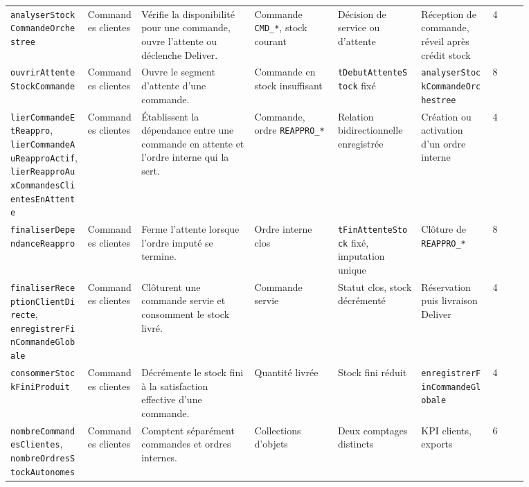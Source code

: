 \begin{landscape}
{\begin{longtable}{L{0.13\linewidth} L{0.09\linewidth} L{0.19\linewidth} L{0.14\linewidth} L{0.14\linewidth} L{0.12\linewidth} L{0.06\linewidth}}
\texttt{analyser\allowbreak Stock\allowbreak Commande\allowbreak Orchestree} & Commandes clientes & Vérifie la disponibilité pour une commande, ouvre l'attente ou déclenche Deliver. & Commande \texttt{CMD\_*}, stock courant & Décision de service ou d'attente & Réception de commande, réveil après crédit stock & 4 \\
\texttt{ouvrir\allowbreak Attente\allowbreak Stock\allowbreak Commande} & Commandes clientes & Ouvre le segment d'attente d'une commande. & Commande en stock insuffisant & \texttt{t\allowbreak Debut\allowbreak Attente\allowbreak Stock} fixé & \texttt{analyser\allowbreak Stock\allowbreak Commande\allowbreak Orchestree} & 8 \\
\texttt{lier\allowbreak Commande\allowbreak Et\allowbreak Reappro}, \texttt{lier\allowbreak Commande\allowbreak Au\allowbreak Reappro\allowbreak Actif}, \texttt{lier\allowbreak Reappro\allowbreak Aux\allowbreak Commandes\allowbreak Clientes\allowbreak En\allowbreak Attente} & Commandes clientes & Établissent la dépendance entre une commande en attente et l'ordre interne qui la sert. & Commande, ordre \texttt{REAPPRO\_*} & Relation bidirectionnelle enregistrée & Création ou activation d'un ordre interne & 4 \\
\texttt{finaliser\allowbreak Dependance\allowbreak Reappro} & Commandes clientes & Ferme l'attente lorsque l'ordre imputé se termine. & Ordre interne clos & \texttt{t\allowbreak Fin\allowbreak Attente\allowbreak Stock} fixé, imputation unique & Clôture de \texttt{REAPPRO\_*} & 8 \\
\texttt{finaliser\allowbreak Reception\allowbreak Client\allowbreak Directe}, \texttt{enregistrer\allowbreak Fin\allowbreak Commande\allowbreak Globale} & Commandes clientes & Clôturent une commande servie et consomment le stock livré. & Commande servie & Statut clos, stock décrémenté & Réservation puis livraison Deliver & 4 \\
\texttt{consommer\allowbreak Stock\allowbreak Fini\allowbreak Produit} & Commandes clientes & Décrémente le stock fini à la satisfaction effective d'une commande. & Quantité livrée & Stock fini réduit & \texttt{enregistrer\allowbreak Fin\allowbreak Commande\allowbreak Globale} & 4 \\
\texttt{nombre\allowbreak Commandes\allowbreak Clientes}, \texttt{nombre\allowbreak Ordres\allowbreak Stock\allowbreak Autonomes} & Commandes clientes & Comptent séparément commandes et ordres internes. & Collections d'objets & Deux comptages distincts & KPI clients, exports & 6 \\


\end{longtable}}
\end{landscape}
